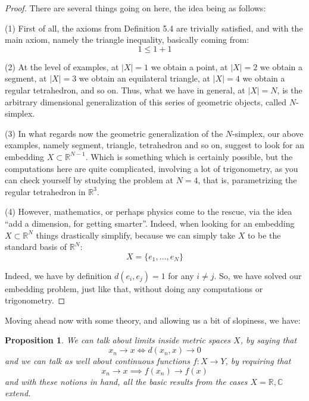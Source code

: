 \documentclass[12pt]{amsbook}
\newtheorem{proposition}[theorem]{Proposition}
\begin{document}
\begin{proof}
There are several things going on here, the idea being as follows:

\medskip

(1) First of all, the axioms from Definition 5.4 are trivially satisfied, and with the main axiom, namely the triangle inequality, basically coming from:
$$1\leq1+1$$

(2) At the level of examples, at $|X|=1$ we obtain a point, at $|X|=2$ we obtain a segment, at $|X|=3$ we obtain an equilateral triangle, at $|X|=4$ we obtain a regular tetrahedron, and so on. Thus, what we have in general, at $|X|=N$, is the arbitrary dimensional generalization of this series of geometric objects, called $N$-simplex.

\medskip

(3) In what regards now the geometric generalization of the $N$-simplex, our above examples, namely segment, triangle, tetrahedron and so on, suggest to look for an embedding $X\subset\mathbb R^{N-1}$. Which is something which is certainly possible, but the computations here are quite complicated, involving a lot of trigonometry, as you can check yourself by studying the problem at $N=4$, that is, parametrizing the regular tetrahedron in $\mathbb R^3$.

\medskip

(4) However, mathematics, or perhaps physics come to the rescue, via the idea ``add a dimension, for getting smarter''. Indeed, when looking for an embedding $X\subset\mathbb R^N$ things drastically simplify, because we can simply take $X$ to be the standard basis of $\mathbb R^N$:
$$X=\{e_1,\ldots,e_N\}$$

Indeed, we have by definition $d(e_i,e_j)=1$ for any $i\neq j$. So, we have solved our embedding problem, just like that, without doing any computations or trigonometry.
\end{proof}

Moving ahead now with some theory, and allowing us a bit of slopiness, we have:

\begin{proposition}
We can talk about limits inside metric spaces $X$, by saying that
$$x_n\to x\iff d(x_n,x)\to0$$
and we can talk as well about continuous functions $f:X\to Y$, by requiring that
$$x_n\to x\implies f(x_n)\to f(x)$$
and with these notions in hand, all the basic results from the cases $X=\mathbb R,\mathbb C$ extend.
\end{proposition}
\end{document}

